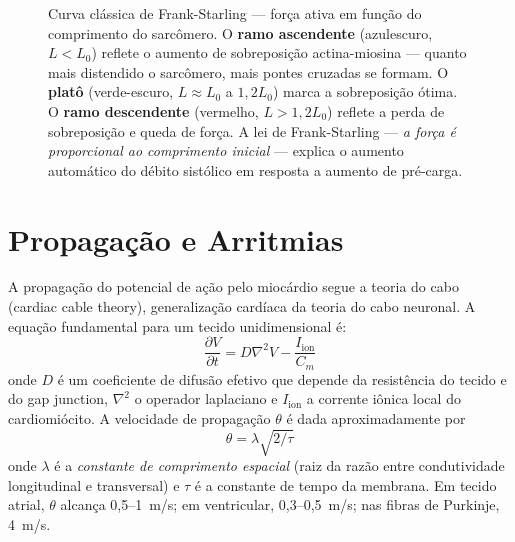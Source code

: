 \begin{figure}[htbp]
\centering
{}
\caption{Curva clássica de Frank-Starling --- força ativa em função do comprimento do sarcômero. O \textbf{ramo ascendente} (azulescuro, $L < L_0$) reflete o aumento de sobreposição actina-miosina --- quanto mais distendido o sarcômero, mais pontes cruzadas se formam. O \textbf{platô} (verde-escuro, $L \approx L_0$ a $1{,}2 L_0$) marca a sobreposição ótima. O \textbf{ramo descendente} (vermelho, $L > 1{,}2 L_0$) reflete a perda de sobreposição e queda de força. A lei de Frank-Starling --- \emph{a força é proporcional ao comprimento inicial} --- explica o aumento automático do débito sistólico em resposta a aumento de pré-carga.}
\label{fig:12-frank-starling}
\end{figure}

\section{Propagação e Arritmias}
\label{sec:12-propagacao}

A propagação do potencial de ação pelo miocárdio segue a teoria do cabo
(cardiac cable theory), generalização cardíaca da teoria do cabo neuronal.
A equação fundamental para um tecido unidimensional é:
\begin{equation}
\frac{\partial V}{\partial t} = D \nabla^2 V - \frac{I_{\mathrm{ion}}}{C_m}
\end{equation}
onde $D$ é um coeficiente de difusão efetivo que depende da resistência
do tecido e do gap junction, $\nabla^2$ o operador laplaciano e
$I_{\mathrm{ion}}$ a corrente iônica local do cardiomiócito. A
velocidade de propagação $\theta$ é dada aproximadamente por
\begin{equation}
\theta = \lambda \sqrt{2/\tau}
\end{equation}
onde $\lambda$ é a \emph{constante de comprimento espacial} (raiz da razão
entre condutividade longitudinal e transversal) e $\tau$ é a constante de
tempo da membrana. Em tecido atrial, $\theta$ alcança 0,5--1~m/s;
em ventricular, 0,3--0,5~m/s; nas fibras de Purkinje, 4~m/s.

